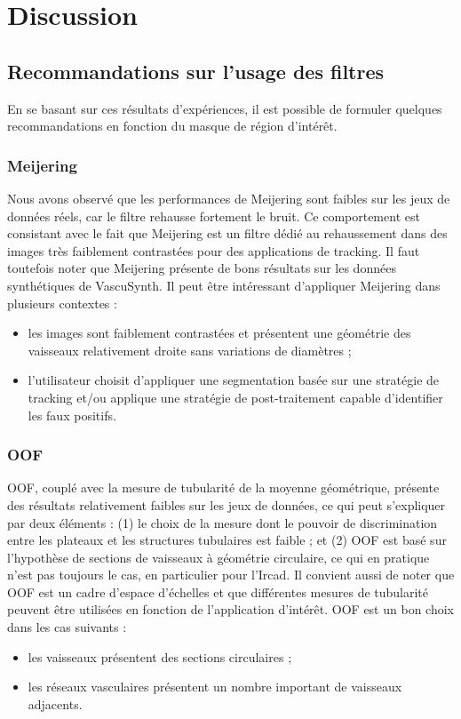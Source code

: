 \section{Discussion}
\subsection{Recommandations sur l'usage des filtres}
En se basant sur ces résultats d'expériences, il est possible de formuler quelques recommandations en fonction du masque de région d'intérêt.
\subsubsection*{Meijering}
 Nous avons observé que les performances de Meijering sont faibles sur les jeux de données réels, car le filtre rehausse fortement le bruit. Ce comportement est consistant avec le fait que Meijering est un filtre dédié au rehaussement dans des images très faiblement contrastées pour des applications de tracking. Il faut toutefois noter que Meijering présente de bons résultats sur les données synthétiques de VascuSynth. Il peut être intéressant d’appliquer Meijering dans plusieurs contextes :
\begin{itemize}
  \item les images sont faiblement contrastées et présentent une géométrie des vaisseaux relativement droite sans variations de diamètres ;
  \item l'utilisateur choisit d'appliquer une segmentation basée sur une stratégie de tracking et/ou applique une stratégie de post-traitement capable d'identifier les faux positifs.
\end{itemize}
\subsubsection*{OOF}
OOF, couplé avec la mesure de tubularité de la moyenne géométrique, présente des résultats relativement faibles sur les jeux de données, ce qui peut s'expliquer par deux éléments : (1) le choix de la mesure dont le pouvoir de discrimination entre les plateaux et les structures tubulaires est faible ; et (2) OOF est basé sur l'hypothèse de sections de vaisseaux à géométrie circulaire, ce qui en pratique n'est pas toujours le cas, en particulier pour l'Ircad. Il convient aussi de noter que OOF est un cadre d'espace d'échelles et que différentes mesures de tubularité peuvent être utilisées en fonction de l'application d'intérêt. OOF est un bon choix dans les cas suivants : 
\begin{itemize}
  \item les vaisseaux présentent des sections circulaires ;
  \item les réseaux vasculaires présentent un nombre important de vaisseaux adjacents.
\end{itemize}

